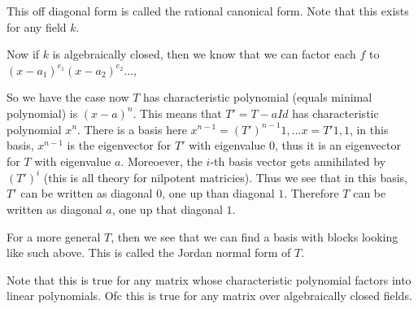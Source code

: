 \documentclass[main.tex]{subfiles}
\begin{document}
This off diagonal form is called the rational canonical form. Note that this exists for any field $k$. 

Now if $k$ is algebraically closed, then we know that we can factor each $f$ to $(x-a_1)^{e_1} (x - a_2)^{e_2}...$,

So we have the case now $T$ has characteristic polynomial (equals minimal polynomial) is $(x-a)^n$. This means that $T ' = T - a Id$ has characteristic polynomial $x^n$. There is a basis here $x^{n-1} = (T')^{n-1} 1,... x = T' 1, 1$, in this basis, $x^{n-1}$ is the eigenvector for $T'$ with eigenvalue $0$, thus it is an eigenvector for $T$ with eigenvalue $a$. Moreoever, the $i$-th basis vector gets annihilated by $(T')^i$ (this is all theory for nilpotent matricies). Thus we see that in this basis, $T'$ can be written as diagonal $0$, one up than diagonal $1$. Therefore $T$ can be written as diagonal $a$, one up that diagonal $1$. 

For a more general $T$, then we see that we can find a basis with blocks looking like such above. This is called the Jordan normal form of $T$.

\begin{remark}
Note that this is true for any matrix whose characteristic polynomial factors into linear polynomials. Ofc this is true for any matrix over algebraically closed fields.
\end{remark}
\end{document}
